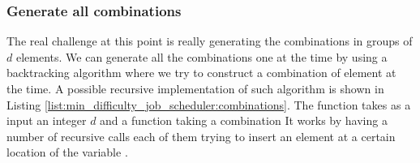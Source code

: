 \subsubsection{Generate all combinations}
The real challenge at this point is really generating the combinations in groups of $d$ elements. 
We can generate all the combinations one at the time by using a backtracking algorithm where we try to construct a combination of element at the time.
A possible recursive implementation of such algorithm is shown in Listing \ref{list:min_difficulty_job_scheduler:combinations}.
The function  takes as a input an integer $d$ and a function taking a combination
It works by having a number of recursive calls each of them trying to insert an element at a certain location of the variable .

\begin{minipage}{\linewidth}
	
\end{minipage}


\begin{minipage}{\linewidth}
	
\end{minipage}


